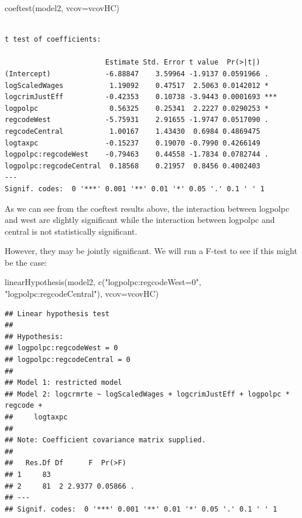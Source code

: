 \documentclass[]{article}
\newenvironment{Shaded}{}{}
\newcommand{\DataTypeTok}[1]{#1}
\newcommand{\KeywordTok}[1]{\textcolor[rgb]{0.00,0.00,1.00}{#1}}
\newcommand{\NormalTok}[1]{#1}
\newcommand{\StringTok}[1]{\textcolor[rgb]{0.00,0.50,0.50}{#1}}
\begin{document}
\begin{Shaded}
\begin{Highlighting}[]
\KeywordTok{coeftest}\NormalTok{(model2, }\DataTypeTok{vcov=}\NormalTok{vcovHC)}
\end{Highlighting}
\end{Shaded}

\begin{verbatim}

t test of coefficients:

                        Estimate Std. Error t value  Pr(>|t|)    
(Intercept)             -6.88847    3.59964 -1.9137 0.0591966 .  
logScaledWages           1.19092    0.47517  2.5063 0.0142012 *  
logcrimJustEff          -0.42353    0.10738 -3.9443 0.0001693 ***
logpolpc                 0.56325    0.25341  2.2227 0.0290253 *  
regcodeWest             -5.75931    2.91655 -1.9747 0.0517090 .  
regcodeCentral           1.00167    1.43430  0.6984 0.4869475    
logtaxpc                -0.15237    0.19070 -0.7990 0.4266149    
logpolpc:regcodeWest    -0.79463    0.44558 -1.7834 0.0782744 .  
logpolpc:regcodeCentral  0.18568    0.21957  0.8456 0.4002403    
---
Signif. codes:  0 '***' 0.001 '**' 0.01 '*' 0.05 '.' 0.1 ' ' 1
\end{verbatim}

As we can see from the coeftest results above, the interaction between
logpolpc and west are slightly significant while the interaction between
logpolpc and central is not statistically significant.

However, they may be jointly significant. We will run a F-test to see if
this might be the case:

\begin{Shaded}
\begin{Highlighting}[]
\KeywordTok{linearHypothesis}\NormalTok{(model2, }\KeywordTok{c}\NormalTok{(}\StringTok{"logpolpc:regcodeWest=0"}\NormalTok{, }\StringTok{"logpolpc:regcodeCentral"}\NormalTok{), }\DataTypeTok{vcov=}\NormalTok{vcovHC)}
\end{Highlighting}
\end{Shaded}

\begin{verbatim}
## Linear hypothesis test
## 
## Hypothesis:
## logpolpc:regcodeWest = 0
## logpolpc:regcodeCentral = 0
## 
## Model 1: restricted model
## Model 2: logcrmrte ~ logScaledWages + logcrimJustEff + logpolpc * regcode + 
##     logtaxpc
## 
## Note: Coefficient covariance matrix supplied.
## 
##   Res.Df Df      F  Pr(>F)  
## 1     83                    
## 2     81  2 2.9377 0.05866 .
## ---
## Signif. codes:  0 '***' 0.001 '**' 0.01 '*' 0.05 '.' 0.1 ' ' 1
\end{verbatim}
\end{document}
